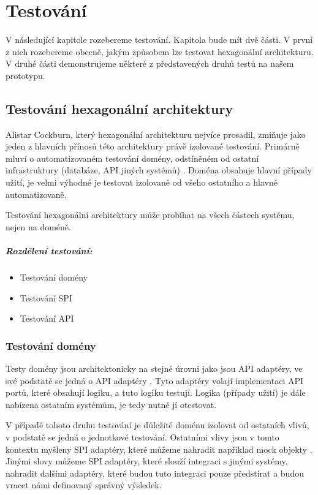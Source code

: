 \chapter{Testování} \label{chap:testing}
V následující kapitole rozebereme testování.
Kapitola bude mít dvě části. V první z nich rozebereme obecně, jakým způsobem lze testovat hexagonální architekturu. V druhé části demonstrujeme některé z představených druhů testů na našem prototypu.
\section{Testování hexagonální architektury}
Alistar Cockburn, který hexagonální architekturu nejvíce prosadil, zmiňuje jako jeden z hlavních přínosů této architektury právě izolované testování. Primárně mluví o automatizovaném testování domény, odstíněném od ostatní infrastruktury (databáze, API jiných systémů) \cite{cockburn}. Doména obsahuje hlavní případy užití, je velmi výhodné je testovat izolovaně od všeho ostatního a hlavně automatizovaně.\par
\noindent Testování hexagonální architektury může probíhat na všech částech systému, nejen na doméně.
\paragraph{Rozdělení testování:}
\begin{itemize}
    \item Testování domény
    \item Testování SPI
    \item Testování API
\end{itemize}
\subsection{Testování domény}
Testy domény jsou architektonicky na stejné úrovni jako jsou API adaptéry, ve své podstatě se jedná o API adaptéry \cite{cockburn}. Tyto adaptéry volají implementaci API portů, které obsahují logiku, a tuto logiku testují. Logika (případy užití) je dále nabízena ostatním systémům, je tedy nutné jí otestovat.\par
V případě tohoto druhu testování je důležité doménu izolovat od ostatních vlivů, v podstatě se jedná o jednotkové testování. Ostatními vlivy jsou v tomto kontextu myšleny SPI adaptéry, které můžeme nahradit například mock objekty \cite{cockburn}. Jinými slovy můžeme SPI adaptéry, které slouží integraci s jinými systémy, nahradit dalšími adaptéry, které budou tuto integraci pouze předstírat a budou vracet námi definovaný správný výsledek.

